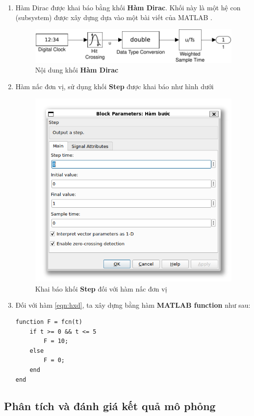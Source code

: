 \documentclass[12pt,a4paper]{article}
\begin{document}
\begin{enumerate}
    \item Hàm Dirac được khai báo bằng khối \textbf{Hàm Dirac}. Khối này là một hệ con (subsystem) được xây dựng dựa vào một bài viết của MATLAB \cite{matlabimpulse}.
    \begin{figure}[ht]
        \centering
        \includegraphics[width=\linewidth]{MATLAB_2.pdf}
        \caption{Nội dung khối \textbf{Hàm Dirac}}
    \end{figure}

    \item Hàm nấc đơn vị, sử dụng khối \textbf{Step} được khai báo như hình dưới
    \begin{figure}[ht]
        \centering
        \includegraphics[width=0.5\linewidth]{MATLAB_3.png}
        \caption{Khai báo khối \textbf{Step} đối với hàm nấc đơn vị}
    \end{figure}

    \newpage
    \item Đối với hàm \eqref{eqn:hxd}, ta xây dựng bằng hàm \textbf{MATLAB function} như sau:
    \begin{lstlisting}[style=matlabstyle,caption=Khai báo hàm \eqref{eqn:hxd}]
function F = fcn(t)
    if t >= 0 && t <= 5
        F = 10;
    else
        F = 0;
    end
end        
    \end{lstlisting}
\end{enumerate}

\newpage
\subsection{Phân tích và đánh giá kết quả mô phỏng}
\end{document}
